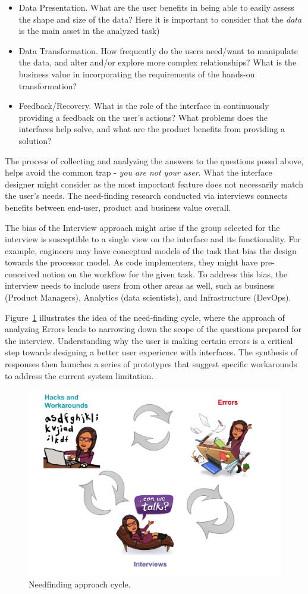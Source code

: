 \documentclass[12pt,letterpaper]{article}
\begin{document}
\begin{itemize}
    \item Data Presentation. What are the user benefits in being able to easily assess the shape and size of the data? Here it is important to consider that the \textit{data} is the main asset in the analyzed task)  
    \item Data Transformation. How frequently do the users need/want to manipulate the data, and alter and/or explore more complex relationships? What is the business value in incorporating the requirements of the hands-on transformation?
    \item Feedback/Recovery. What is the role of the interface in continuously providing a feedback on the user's actions? What problems does the interfaces help solve, and what are the product benefits from providing a solution?
\end{itemize}

The process of collecting and analyzing the answers to the questions posed above, helps avoid the common trap - \textit{you are not your user}. What the interface designer might consider as the most important feature does not necessarily match the user's needs. The need-finding research conducted via interviews connects benefits between end-user, product and business value overall. 

The bias of the Interview approach might arise if the group selected for the interview is susceptible to a single view on the interface and its functionality. For example, engineers may have conceptual models of the task that bias the design towards the processor model. As code implementers, they might have pre-conceived notion on the workflow for the given task. To address this bias, the interview needs to include users from other areas as well, such as business (Product Managers), Analytics (data scientists), and Infrastructure (DevOps). 

Figure~\ref{fig::7} illustrates the idea of the need-finding cycle, where the approach of analyzing Errors leads to narrowing down the scope of the questions prepared for the interview. Understanding why the user is making certain errors is a critical step towards designing a better user experience with interfaces. The synthesis of responses then launches a series of prototypes that suggest specific workarounds to address the current system limitation.

\begin{figure}[h]
\centering
\includegraphics[scale=.5]{approach_cycle.png}
\caption{Needfinding approach cycle.}
\label{fig::7}
\end{figure}

 

\end{document}
